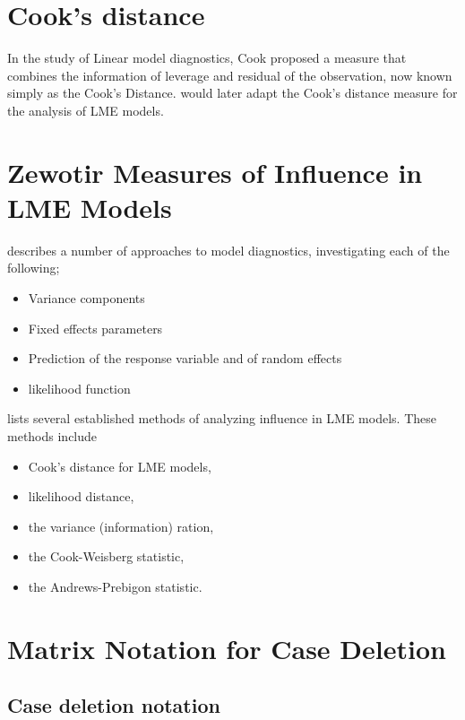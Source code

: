 \documentclass[12pt, a4paper]{report}
\theoremstyle{plain}
\theoremstyle{definition}
\theoremstyle{remark}
\begin{document}
\section*{Cook's distance}
In the study of Linear model diagnostics, Cook proposed a measure that combines the information of leverage and residual of the observation, now known simply as the Cook's Distance. \citet{CPJ} would later adapt the Cook's distance measure for the analysis of LME models.





\section{Zewotir Measures of Influence in LME Models}%
\citet{Zewotir} describes a number of approaches to model diagnostics, investigating each of the following;
\begin{itemize}
	\item Variance components
	\item Fixed effects parameters
	\item Prediction of the response variable and of random effects
	\item likelihood function
\end{itemize}

\citet{Zewotir} lists several established methods of analyzing influence in LME models. These methods include \begin{itemize}
	\item Cook's distance for LME models,
	\item {} likelihood distance,
	\item the variance (information) ration,
	\item the  Cook-Weisberg statistic,
	\item the  Andrews-Prebigon statistic.
\end{itemize}




\newpage
\section{Matrix Notation for Case Deletion} %

\subsection{Case deletion notation} %
\end{document}
